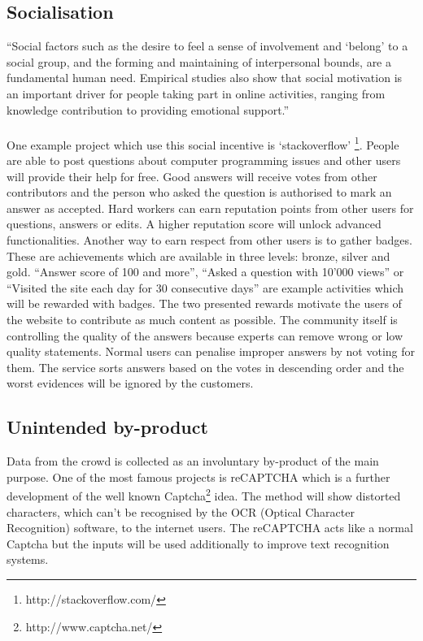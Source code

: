 \subsection{Socialisation}
``Social factors such as the desire to feel a sense of involvement and `belong' to a social group, and the forming and maintaining of interpersonal bounds, are a fundamental human need. Empirical studies also show that social motivation is an important driver for people taking part in online activities, ranging from knowledge contribution to providing emotional support.'' \cite{yu} \\
\\
One example project which use this social incentive is `stackoverflow' \footnote{http://stackoverflow.com/}. People are able to post questions about computer programming issues and other users will provide their help for free. Good answers will receive votes from other contributors and the person who asked the question is authorised to mark an answer as accepted. Hard workers can earn reputation points from other users for questions, answers or edits. A higher reputation score will unlock advanced functionalities. Another way to earn respect from other users is to gather badges. These are achievements which are available in three levels: bronze, silver and gold. ``Answer score of 100 and more'', ``Asked a question with 10'000 views'' or ``Visited the site each day for 30 consecutive days'' are example activities which will be rewarded with badges. The two presented rewards motivate the users of the website to contribute as much content as possible. The community itself is controlling the quality of the answers because experts can remove wrong or low quality statements. Normal users can penalise improper answers by not voting for them. The service sorts answers based on the votes in descending order and the worst evidences will be ignored by the customers.

\subsection{Unintended by-product}
Data from the crowd is collected as an involuntary by-product of the main purpose. One of the most famous projects is reCAPTCHA\cite{recaptcha} which is a further development of the well known Captcha\footnote{http://www.captcha.net/} idea. The method will show distorted characters,  which can't be recognised by the OCR (Optical Character Recognition) software, to the internet users. The reCAPTCHA acts like a normal Captcha but the inputs will be used additionally to improve text recognition systems.

